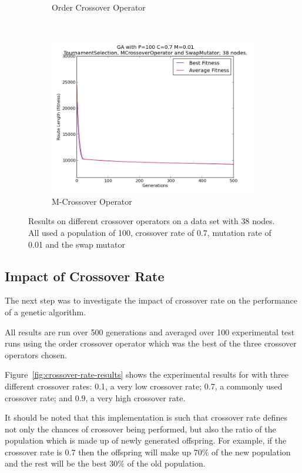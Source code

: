 \documentclass[10pt, a4paper]{article}
\begin{document}
\begin{figure}[h]
\begin{subfigure}[b]{0.67\textwidth}
\caption{Order Crossover Operator}
\end{subfigure}
~
\begin{subfigure}[b]{0.67\textwidth}
\includegraphics[width=\textwidth]{img/results/mcrossoveroperator/swapmutator/n38p100c07m001}
\caption{M-Crossover Operator}
\end{subfigure}

\caption{Results on different crossover operators on a data set with 38 nodes.
         All used a population of 100, crossover rate of 0.7, mutation rate of 
         0.01 and the swap mutator}
\label{fig:crossover-results}
\end{figure}



\subsection{Impact of Crossover Rate}
The next step was to investigate the impact of crossover rate on the 
performance of a genetic algorithm.

All results are run over 500 generations and averaged over 100 experimental 
test runs using the order crossover operator which was the best of the three
crossover operators chosen.

Figure~\ref{fig:crossover-rate-results} shows the experimental results for with
three different crossover rates: 0.1, a very low crossover rate; 0.7, a 
commonly used crossover rate; and 0.9, a very high crossover rate.

It should be noted that this implementation is such that crossover rate defines
not only the chances of crossover being performed, but also the ratio of the
population which is made up of newly generated offspring. For example, if the
crossover rate is $0.7$ then the offspring will make up $70\%$ of the new
population and the rest will be the best $30\%$ of the old population.
\end{document}
